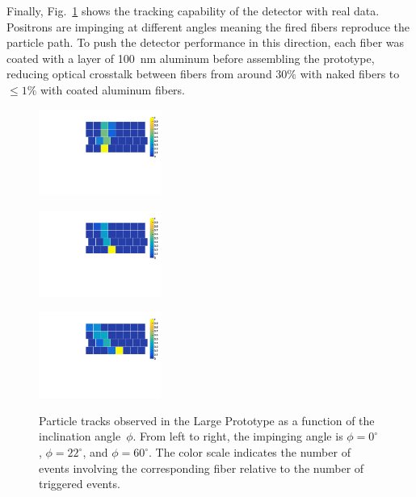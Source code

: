 \begin{refsection}
        \noindent
        Finally, Fig.~\ref{fig:SciFi_position} shows the tracking capability of the detector with real data. Positrons are impinging at different angles meaning the fired fibers reproduce the particle path. 
        To push the detector performance in this direction, each fiber was coated with a layer of \SI{100}{nm} aluminum before assembling the prototype, reducing optical crosstalk between fibers from around $30\%$ with naked fibers to $\leq1\%$ with coated aluminum fibers.
        
        \begin{figure}
        	\centering
         \begin{minipage}{.3\textwidth}
          \centering	
        		\includegraphics[width=4cm]{Figures/muEDM/prototype/SquaredFiberIlluminationOffset2275.pdf}
        		\label{Ffig:angletracks:0deg}
         \end{minipage}%
         \begin{minipage}{.3\textwidth}
          \centering		
        		\includegraphics[width=4cm]{Figures/muEDM/prototype/SquaredFiberIlluminationOffset2272.pdf}
        		\label{fig:angletracks:22deg}
        \end{minipage}%
        \begin{minipage}{.3\textwidth}
          \centering
        		\includegraphics[width=4cm]{Figures/muEDM/prototype/SquaredFiberIlluminationOffset2274.pdf}
        		\label{fig:angletracks:60deg}
        \end{minipage}%
        \caption[]{Particle tracks observed in the Large Prototype as a function of the inclination angle~$\phi$. From left to right, the impinging angle is $\phi = 0^{\circ}$, $\phi = 22^{\circ}$, and $\phi = 60^{\circ}$. The color scale indicates the number of events involving the corresponding fiber relative to the number of triggered events.}
        \label{fig:SciFi_position}
        \end{figure}
        

\end{refsection}
